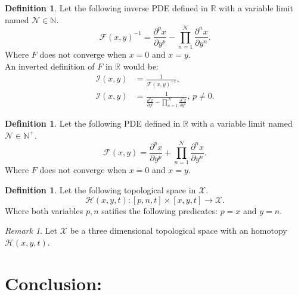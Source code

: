 \documentclass[10pt]{article}
\theoremstyle{plain}
\theoremstyle{definition}
\newtheorem{definition}[theorem]{Definition}
\theoremstyle{remark}
\newtheorem{remark}[theorem]{Remark}
\begin{document}
\begin{definition}
\label{def:1}
Let the following inverse PDE defined in $\mathbb{R}$ with a variable limit named $\mathcal{N} \in \mathbb{N}$.
\begin{equation}
	\mathcal{F}(x, y)^{-1} = \frac{\partial^p x}{ \partial y^p} - \prod_{n=1}^{\mathcal{N}} \frac{\partial^n x}{ \partial y^n}. 
\end{equation}
Where $F$ does not converge when $x=0$ and $x=y$.\\
An inverted definition of $F$ in $\mathbb{R}$ would be:
\begin{align*}
	\mathcal{I}(x, y) &= \frac{1}{\mathcal{F}(x, y)^{-1}},\\
	\mathcal{I}(x, y) &= \frac{1}{\frac{\partial^p x}{ \partial y^p} - \prod_{n=1}^{\mathcal{N}} \frac{\partial^n x}{ \partial y^n}}, \, p \neq 0.
\end{align*}
\end{definition}

\begin{definition}
\label{def:2}
Let the following PDE defined in $\mathbb{R}$ with a variable limit named $\mathcal{N} \in \mathbb{N}^{+}$.
\begin{equation}
	\mathcal{F}(x, y) = \frac{\partial^p x}{ \partial y^p} + \prod_{n=1}^{\mathcal{N}} \frac{\partial^n x}{ \partial y^n}. 
\end{equation}
Where $F$ does not converge when $x=0$ and $x=y$.
\end{definition}

\begin{definition}
\label{def:3}
Let the following topological space in $\mathcal{X}$.
\begin{equation}
	\mathcal{H}(x, y, t) : [p, n, t] \times [x, y, t] \to \mathcal{X}.
\end{equation}
Where both variables $p, n$ satifies the following predicates: $p=x$ and $y=n$.
\end{definition}

\begin{remark}
\label{rem:3.1}
	Let $\mathcal{X}$ be a three dimensional topological space with an homotopy $\mathcal{H}(x, y, t)$.
\end{remark}

\section{Conclusion:}

\nocite{*}



\end{document}
